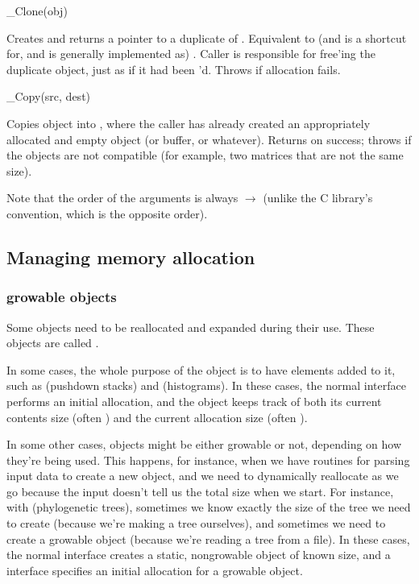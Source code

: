 \begin{sreapi}

\hypertarget{ifc:Clone}
{\item[\_Clone(obj)]}

Creates and returns a pointer to a duplicate of .
Equivalent to (and is a shortcut for, and is generally implemented as)
. Caller is responsible
for free'ing the duplicate object, just as if it had been
'd. Throws  if allocation fails.

\hypertarget{ifc:Copy}
{\item[\_Copy(src, dest)]}

Copies  object into , where the caller has
already created an appropriately allocated and empty 
object (or buffer, or whatever). Returns  on success;
throws  if the objects are not compatible (for
example, two matrices that are not the same size).

Note that the order of the arguments is always 
$\rightarrow$  (unlike the C library's 
convention, which is the opposite order).

\end{sreapi}

  \subsection{Managing memory allocation}

  \subsubsection{growable objects}

Some objects need to be reallocated and expanded during their use.
These objects are called .

In some cases, the whole purpose of the object is to have elements
added to it, such as  (pushdown stacks) and
 (histograms). In these cases, the normal
 interface performs an initial allocation, and the
object keeps track of both its current contents size (often
) and the current allocation size (often
). 

In some other cases, objects might be either growable or not,
depending on how they're being used. This happens, for instance, when
we have routines for parsing input data to create a new object, and we
need to dynamically reallocate as we go because the input doesn't tell
us the total size when we start. For instance, with 
(phylogenetic trees), sometimes we know exactly the size of the tree
we need to create (because we're making a tree ourselves), and
sometimes we need to create a growable object (because we're reading a
tree from a file). In these cases, the normal 
interface creates a static, nongrowable object of known size, and a
 interface specifies an initial allocation
for a growable object.

